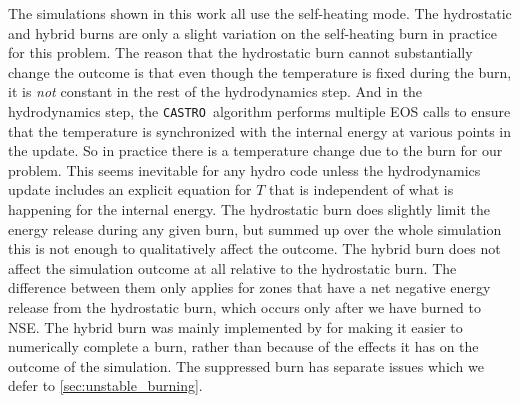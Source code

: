 \documentclass[twocolumn,numberedappendix]{../aastex6}
\newcommand{\castro}{\texttt{CASTRO}}
\begin{document}
The simulations shown in this work all use the self-heating mode. The hydrostatic
and hybrid burns are only a slight variation on the self-heating burn in practice
for this problem.
The reason that the hydrostatic burn cannot substantially change the outcome is
that even though the temperature is fixed during the burn, it is \textit{not}
constant in the rest of the hydrodynamics step. And in the hydrodynamics step,
the \castro\ algorithm performs multiple EOS calls to ensure that the temperature
is synchronized with the internal energy at various points in the update. So in
practice there is a temperature change due to the burn for our problem. This seems
inevitable for any hydro code unless the hydrodynamics update includes an explicit
equation for $T$ that is independent of what is happening for the internal energy.
The hydrostatic burn does slightly limit the energy release during any given burn,
but summed up over the whole simulation this is not enough to qualitatively affect
the outcome. The hybrid burn does not affect the simulation outcome at all relative
to the hydrostatic burn. The difference between them only applies for zones that have
a net negative energy release from the hydrostatic burn, which occurs only after
we have burned to NSE. The hybrid burn was mainly implemented by \citet{raskin:2010}
for making it easier to numerically complete a burn, rather than because of the
effects it has on the outcome of the simulation. The suppressed burn has separate
issues which we defer to \autoref{sec:unstable_burning}.
\end{document}
